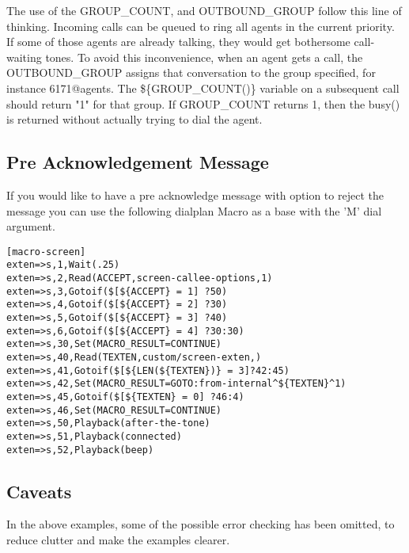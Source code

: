 The use of the GROUP\_COUNT, and OUTBOUND\_GROUP follow this line
of thinking. Incoming calls can be queued to ring all agents in the
current priority. If some of those agents are already talking, they
would get bothersome call-waiting tones. To avoid this inconvenience,
when an agent gets a call, the OUTBOUND\_GROUP assigns that
conversation to the group specified, for instance 6171@agents.
The \$\{GROUP\_COUNT()\} variable on a subsequent call should return
"1" for that group. If GROUP\_COUNT returns 1, then the busy()
is returned without actually trying to dial the agent.

\subsection{Pre Acknowledgement Message}

If you would like to have a pre acknowledge message with option to reject the message
you can use the following dialplan Macro as a base with the 'M' dial argument.

\begin{astlisting}
\begin{verbatim}
[macro-screen]
exten=>s,1,Wait(.25)
exten=>s,2,Read(ACCEPT,screen-callee-options,1)
exten=>s,3,Gotoif($[${ACCEPT} = 1] ?50)
exten=>s,4,Gotoif($[${ACCEPT} = 2] ?30)
exten=>s,5,Gotoif($[${ACCEPT} = 3] ?40)
exten=>s,6,Gotoif($[${ACCEPT} = 4] ?30:30)
exten=>s,30,Set(MACRO_RESULT=CONTINUE)
exten=>s,40,Read(TEXTEN,custom/screen-exten,)
exten=>s,41,Gotoif($[${LEN(${TEXTEN})} = 3]?42:45)
exten=>s,42,Set(MACRO_RESULT=GOTO:from-internal^${TEXTEN}^1)
exten=>s,45,Gotoif($[${TEXTEN} = 0] ?46:4)
exten=>s,46,Set(MACRO_RESULT=CONTINUE)
exten=>s,50,Playback(after-the-tone)
exten=>s,51,Playback(connected)
exten=>s,52,Playback(beep)
\end{verbatim}
\end{astlisting}

\subsection{Caveats}

In the above examples, some of the possible error checking has been omitted,
to reduce clutter and make the examples clearer.
